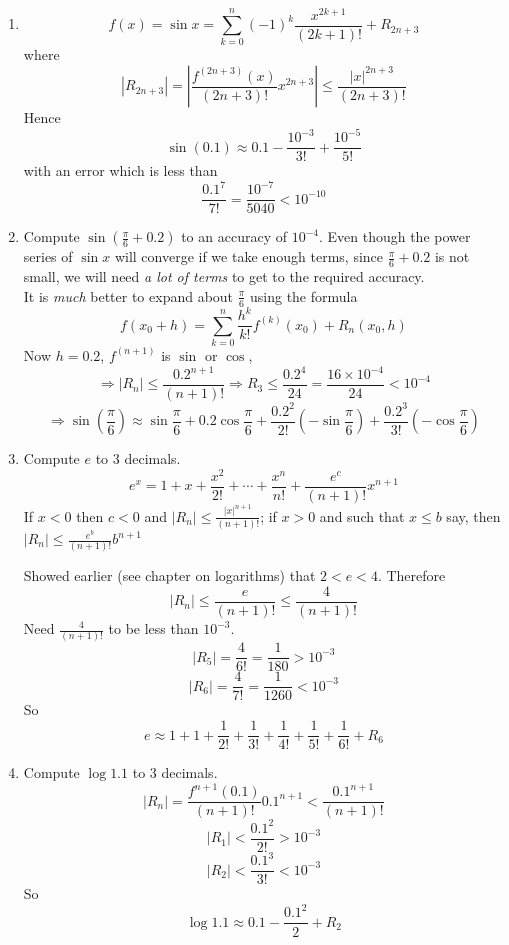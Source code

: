 \documentclass[12pt]{report}
\theoremstyle{definition}
\begin{document}
\begin{ex}
    \,

    \begin{enumerate}[label = (\arabic*)]
        \item \[
            f(x) = \sin{x} = \sum_{k=0}^{n} {(-1)}^{k}\frac{x^{2k+1}}{(2k+1)!} + R_{2n+3}
        \]where\[
            |R_{2n+3}| = \left|\frac{f^{(2n+3)}(x)}{(2n+3)!}x^{2n+3}\right| \le \frac{{|x|}^{2n+3}}{(2n+3)!}
        \]Hence \[
        \sin{(0.1)} \approx 0.1 - \frac{10^{-3}}{3!} + \frac{10^{-5}}{5!}
        \]with an error which is less than\[
            \frac{0.1^{7}}{7!} = \frac{10^{-7}}{5040} < 10^{-10}
        \]
        \item Compute $\sin{(\frac{\pi}{6} + 0.2)}$ to an accuracy of $10^{-4}$.
            Even though the power series of $\sin{x}$ will converge if we take enough terms,
            since $\frac{\pi}{6} + 0.2$ is not small, we will need \emph{a lot of terms} to get to the required accuracy.
            \\It is \emph{much} better to expand about $\frac{\pi}{6}$ using the formula \[
                f(x_0 + h) = \sum_{k=0}^{n} \frac{h^{k}}{k!}f^{(k)}(x_0) + R_n(x_0,h)
            \]Now $h = 0.2$, $f^{(n+1)}$ is $\sin$ or $\cos$, \[
            \Rightarrow |R_n| \le \frac{0.2^{n+1}}{(n+1)!}
            \Rightarrow R_3 \le \frac{0.2^{4}}{24} = \frac{16 \times 10^{-4}}{24} < 10^{-4}
            \]\[
            \Rightarrow \sin{(\frac{\pi}{6})} \approx \sin{\frac{\pi}{6}} + 0.2\cos{\frac{\pi}{6}} 
            + \frac{0.2^{2}}{2!} \left(-\sin{\frac{\pi}{6}}\right) + \frac{0.2^{3}}{3!}\left(-\cos{\frac{\pi}{6}}\right) 
            \]
        \item Compute $e$ to 3 decimals. \[
                e^{x} = 1 + x + \frac{x^{2}}{2!} + \cdots + \frac{x^{n}}{n!} + \frac{e^{c}}{(n+1)!} x^{n+1}
            \]If $x<0$ then $c<0$ and $|R_n| \le \frac{{|x|}^{n+1}}{(n+1)!}$;
            if $x>0$ and such that $x \le b$ say, then $|R_n| \le \frac{e^{b}}{(n+1)!} b^{n+1}$

        Showed earlier (see chapter on logarithms) that $2<e<4$. Therefore\[
                |R_n| \le \frac{e}{(n+1)!} \le \frac{4}{(n+1)!}
            \]Need $\frac{4}{(n+1)!}$ to be less than $10^{-3}$. \[
                |R_5| = \frac{4}{6!} = \frac{1}{180} > 10^{-3}
            \]\[
                |R_6| = \frac{4}{7!} = \frac{1}{1260} < 10^{-3}
            \]So \[
                e \approx 1 + 1 + \frac{1}{2!} + \frac{1}{3!} + \frac{1}{4!} + \frac{1}{5!} + \frac{1}{6!} + R_6
            \]
        \item Compute $\log{1.1}$ to 3 decimals.\[
                |R_n| = \frac{f^{n+1}(0.1)}{(n+1)!} 0.1^{n+1} < \frac{0.1^{n+1}}{(n+1)!}
        \]\[
            |R_1| < \frac{0.1^{2}}{2!} > 10^{-3}
        \]\[
            |R_2| < \frac{0.1^{3}}{3!} < 10^{-3}
        \]So\[
        \log{1.1} \approx 0.1 - \frac{0.1^{2}}{2} + R_2
        \]
    \end{enumerate}
\end{ex}
\end{document}
